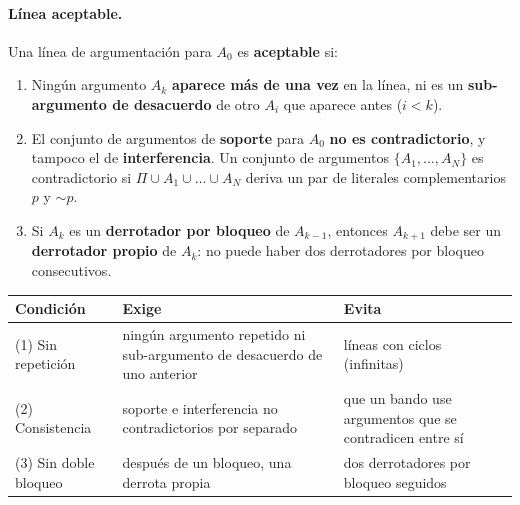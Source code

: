 \documentclass[11pt,a4paper]{article}
\begin{document}
\paragraph{Línea aceptable.} Una línea de argumentación para $A_0$ es \textbf{aceptable} si:
\begin{enumerate}
  \item Ningún argumento $A_k$ \textbf{aparece más de una vez} en la línea, ni es un \textbf{sub-argumento de desacuerdo} de otro $A_i$ que aparece antes ($i < k$).
  \item El conjunto de argumentos de \textbf{soporte} para $A_0$ \textbf{no es contradictorio}, y tampoco el de \textbf{interferencia}. Un conjunto de argumentos $\{A_1, \dots, A_N\}$ es contradictorio si $\Pi \cup A_1 \cup \dots \cup A_N$ deriva un par de literales complementarios $p$ y ${\sim}p$.
  \item Si $A_k$ es un \textbf{derrotador por bloqueo} de $A_{k-1}$, entonces $A_{k+1}$ debe ser un \textbf{derrotador propio} de $A_k$: no puede haber dos derrotadores por bloqueo consecutivos.
\end{enumerate}

\begin{center}
\small
\begin{tabularx}{\linewidth}{@{}l X X@{}}
\toprule
\textbf{Condición} & \textbf{Exige} & \textbf{Evita} \\
\midrule
(1) Sin repetición & ningún argumento repetido ni sub-argumento de desacuerdo de uno anterior & líneas con ciclos (infinitas) \\
(2) Consistencia & soporte e interferencia no contradictorios por separado & que un bando use argumentos que se contradicen entre sí \\
(3) Sin doble bloqueo & después de un bloqueo, una derrota propia & dos derrotadores por bloqueo seguidos \\
\bottomrule
\end{tabularx}
\end{center}
\end{document}
